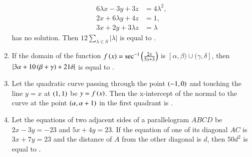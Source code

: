 \documentclass[journal]{IEEEtran}
\begin{document}
\begin{enumerate}[start = 16]
\begin{align*}
	6\lambda x - 3y + 3z &= 4\lambda^2,\\ 
	2x + 6\lambda y + 4z &= 1, \\
	3x + 2y + 3\lambda z &= \lambda 
\end{align*}
has no solution. Then $12 \sum_{\lambda \in S} |\lambda|$ is equal to \underline{\hspace{1 cm}}. 
\item If the domain of the function $f\left(x\right) = \sec^{-1}\left(\frac{2x}{5x+3}\right)$ is $[\alpha,\beta) \cup (\gamma,\delta]$, then $\left\vert3\alpha +10\left(\beta + \gamma\right) + 21\delta\right\vert$ is equal to \underline{\hspace{1 cm}}. 
\item Let the quadratic curve passing through the point $\left(-1,0\right)$ and touching the line $y=x$ at $\left(1,1\right)$ be $y=f\left(x\right)$. Then the x-intercept of the normal to the curve at the point $\left(\alpha,\alpha + 1\right)$ in the first quadrant is \underline{\hspace{1 cm}}.
\item Let the equations of two adjacent sides of a parallelogram $ABCD$ be $2x-3y=-23$ and $5x + 4y = 23$. If the equation of one of its diagonal $AC$ is $3x + 7y = 23$ and the distance of $A$ from the other diagonal is $d$, then $50d^2$ is equal to \underline{\hspace{1 cm}}. 
\end{enumerate}
\end{document}
